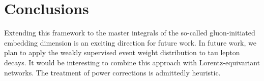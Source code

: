 \section{Conclusions}\label{sec:conclusions}

Extending this framework to the master integrals of the so-called
gluon-initiated embedding dimension is an exciting direction for future
work. In future work, we plan to apply the weakly supervised event
weight distribution to tau lepton decays. It would be interesting to
combine this approach with Lorentz-equivariant networks. The treatment
of power corrections is admittedly heuristic.

